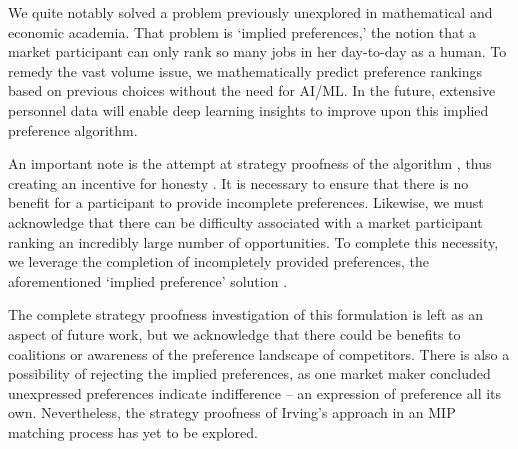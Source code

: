 We quite notably solved a problem previously unexplored in mathematical and economic academia. That problem is ‘implied preferences,’ the notion that a market participant can only rank so many jobs in her day-to-day as a human.  To remedy the vast volume issue, we mathematically predict preference rankings based on previous choices without the need for AI/ML.  In the future, extensive personnel data will enable deep learning insights to improve upon this implied preference algorithm. 

An important note is the attempt at strategy proofness of the algorithm \cite{2011_Budish} \cite{2006_Atila}, thus creating an incentive for honesty \cite{1982_Roth}. It is necessary to ensure that there is no benefit for a participant to provide incomplete preferences.  Likewise, we must acknowledge that there can be difficulty associated with a market participant ranking an incredibly large number of opportunities. To complete this necessity, we leverage the completion of incompletely provided preferences, the aforementioned ‘implied preference’ solution \cite{2019_Shaw}. 

The complete strategy proofness investigation of this formulation is left as an aspect of future work, but we acknowledge that there could be benefits to coalitions or awareness of the preference landscape of competitors. There is also a possibility of rejecting the implied preferences, as one market maker concluded unexpressed preferences indicate indifference \cite{1994_Irving} -- an expression of preference all its own. Nevertheless, the strategy proofness of Irving’s approach in an MIP matching process has yet to be explored. 
